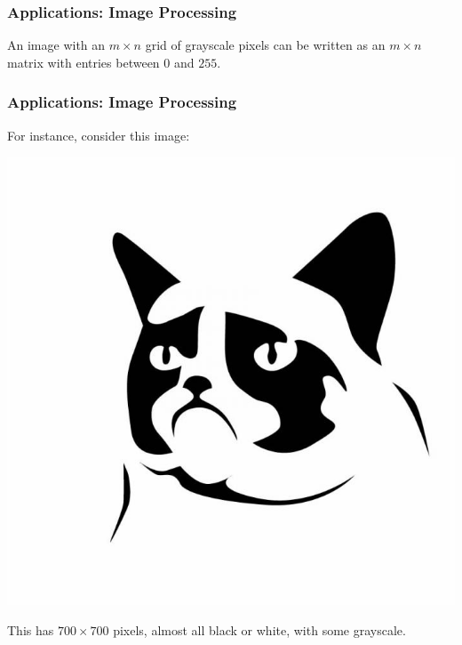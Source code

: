 \documentclass[12pt]{beamer}
\theoremstyle{definition}
\begin{document}
\begin{frame}
\frametitle{Applications: Image Processing}
An image with an $m\times n$ grid of grayscale pixels can
be written as an $m \times n$ matrix with entries between
$0$ and $255$.


\end{frame}


\begin{frame}
\frametitle{Applications: Image Processing}
For instance, consider this image:

\centerline{\includegraphics[width=.5\textwidth]{grumpy.jpg}}

This has $700 \times 700$ pixels, almost all black or white, with
some grayscale. 
\end{frame}
\end{document}
